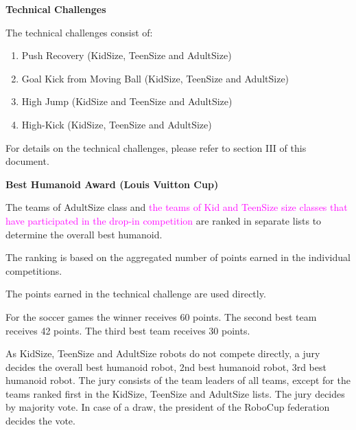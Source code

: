 \color{black}

\bigskip

{\bfseries Technical Challenges}

\headlinebox

The technical challenges consist of:

\begin{enumerate}
\item Push Recovery (KidSize, TeenSize and AdultSize)
\item Goal Kick from Moving Ball (KidSize, TeenSize and AdultSize)
\item High Jump (KidSize and TeenSize and AdultSize)
\item High-Kick (KidSize, TeenSize and AdultSize)
\end{enumerate}

For details on the technical challenges, please refer to section III of this document.

\bigskip

{\bfseries Best Humanoid Award (Louis Vuitton Cup)}

\headlinebox
 
The teams of AdultSize class and \textcolor{magenta}{the teams of Kid and TeenSize size classes that have participated in the drop-in competition} are ranked in separate lists to determine the overall best humanoid.

The ranking is based on the aggregated number of points earned in the individual competitions.

\bigskip

The points earned in the technical challenge are used directly.

\bigskip

For the soccer games the winner receives 60 points. The second best team receives 42 points. The third best team receives 30 points.

\bigskip

As KidSize, TeenSize and AdultSize robots do not compete directly, a jury decides the overall best humanoid robot, 2nd best humanoid robot, 3rd best humanoid robot. The jury consists of the team leaders of all teams, except for the teams ranked first in the KidSize, TeenSize and AdultSize lists. The jury decides by majority vote. In case of a draw, the president of the RoboCup federation decides the vote.


